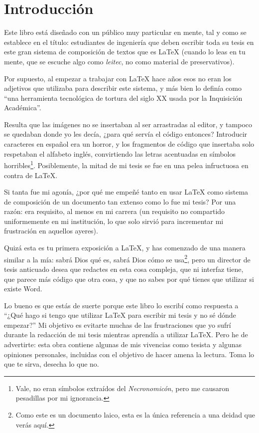 \chapter{Introducción}
\label{cha:introduccion}



Este libro está diseñado con un público muy particular en mente, tal y como se establece en el título: estudiantes de ingeniería que deben escribir toda su tesis en este gran sistema de composición de textos que es \LaTeX{} (cuando lo leas en tu mente, que se escuche algo como \emph{leitec}, no como material de preservativos).

Por supuesto, al empezar a trabajar con \LaTeX{} hace años esos no eran los adjetivos que utilizaba para describir este sistema, y más bien lo definía como ``una herramienta tecnológica de tortura del siglo XX usada por la Inquisición Académica''.

Resulta que las imágenes no se insertaban al ser arrastradas al editor, y tampoco se quedaban donde yo les decía, ¿para qué servía el código entonces? Introducir caracteres en español era un horror, y los fragmentos de código que insertaba solo respetaban el alfabeto inglés, convirtiendo las letras acentuadas en símbolos horribles\footnote{Vale, no eran símbolos extraídos del \emph{Necronomicón}, pero me causaron pesadillas por mi ignorancia.}. Posiblemente, la mitad de mi tesis se fue en una pelea infructuosa en contra de \LaTeX.

Si tanta fue mi agonía, ¿por qué me empeñé tanto en usar \LaTeX{}  como sistema de composición de un documento tan extenso como lo fue mi tesis? Por una razón: era requisito, al menos en mi carrera (un requisito no compartido uniformemente en mi institución, lo que solo sirvió para incrementar mi frustración en aquellos ayeres).

Quizá esta es tu primera exposición a \LaTeX, y has comenzado de una manera similar a la mía: sabrá Dios qué es, sabrá Dios cómo se usa\footnote{Como este es un documento laico, esta es la única referencia a una deidad que verás aquí.}, pero un director de tesis anticuado desea que redactes en esta cosa compleja, que ni interfaz tiene, que parece más código que otra cosa, y que no sabes por qué tienes que utilizar si existe Word.

Lo bueno es que estás de suerte porque este libro lo escribí como respuesta a ``¿Qué hago si tengo que utilizar \LaTeX{} para escribir mi tesis y no sé dónde empezar?''
Mi objetivo es evitarte muchas de las frustraciones que yo sufrí durante la redacción de mi tesis mientras aprendía a utilizar \LaTeX{}. Pero he de advertirte: esta obra contiene algunas de mis vivencias como tesista y algunas opiniones personales, incluidas con el objetivo de hacer amena la lectura. Toma lo que te sirva, desecha lo que no.


